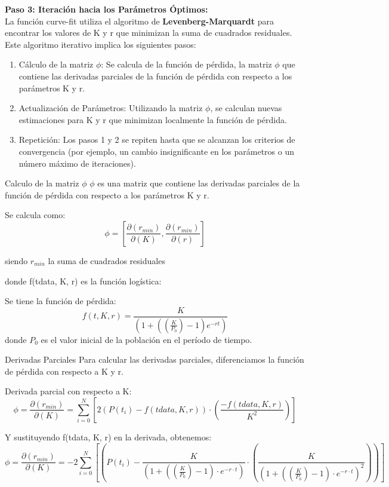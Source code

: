 \documentclass{beamer}
\begin{document}
\begin{frame}
    \textbf{Paso 3: Iteración hacia los Parámetros Óptimos:}\\
    \small{La función curve-fit utiliza el algoritmo de \textbf{Levenberg-Marquardt} para encontrar los valores de K y r que minimizan la suma de cuadrados residuales. Este algoritmo iterativo implica los siguientes pasos:}
    \begin{enumerate}
        \item \small{Cálculo de la matriz $\phi$: Se calcula de la función de pérdida, la matriz $\phi$ que contiene las derivadas parciales de la función de pérdida con respecto a los parámetros K y r.}
        \item \small{Actualización de Parámetros: Utilizando la matriz $\phi$, se calculan nuevas estimaciones para K y r que minimizan localmente la función de pérdida.}
        \item \small{Repetición: Los pasos 1 y 2 se repiten hasta que se alcanzan los criterios de convergencia (por ejemplo, un cambio insignificante en los parámetros o un número máximo de iteraciones).}
    \end{enumerate}
\end{frame}
\begin{frame}{Calculo de la matriz $\phi$}
    $\phi$ es una matriz que contiene las derivadas parciales de la función de pérdida con respecto a los parámetros K y r.
    \begin{block}{Se calcula como: }
        $$\phi = [\frac{\partial(r_{min})}{\partial(K)}, \frac{\partial(r_{min})}{\partial(r)}]$$
        
        \begin{center}\small{siendo $r_{min}$ la suma de cuadrados residuales}\end{center}
    \end{block}
    donde f(tdata, K, r) es la función logística:
    \begin{block}{Se tiene la función de pérdida:}
    $$f(t, K, r) = \frac{K}{(1 + ((\frac{K}{P_{0}}) - 1)e^{-rt})}$$
    donde $P_{0}$ es el valor inicial de la población en el período de tiempo. 
    \end{block}
\end{frame}

\begin{frame}{Derivadas Parciales}    
\small{Para calcular las derivadas parciales, diferenciamos la función de pérdida con respecto a K y r.\\}
\begin{block}{Derivada parcial con respecto a K:}
$$\phi = \frac{\partial(r_{min})}{\partial(K)} = \sum_{i=0}^{N}[2(P(t_{i}) - f(tdata, K, r)) \cdot (\frac{-f(tdata, K, r)}{K^{2}})]$$
\end{block}
\begin{block}{Y sustituyendo  f(tdata, K, r) en la derivada, obtenemos:}
    $$\phi = \frac{\partial(r_{min})}{\partial(K)} = -2\sum_{i=0}^{N}[(P(t_{i}) - \frac{K}{(1 + ((\frac{K}{P_{0}}) - 1) \cdot e^{-r \cdot t})} \cdot (\frac{K}{(1 + ((\frac{K}{P_{0}}) - 1) \cdot e^{-r \cdot t})^{2}}))]$$    
\end{block}
\end{frame}
\end{document}
